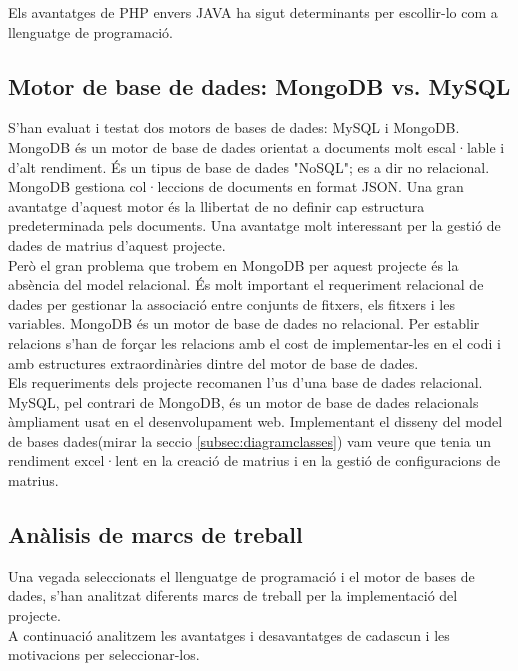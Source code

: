 Els avantatges de PHP envers JAVA ha sigut determinants per escollir-lo com a llenguatge de programació.

\subsection{Motor de base de dades: MongoDB vs. MySQL}
S'han evaluat i testat dos motors de bases de dades: MySQL i MongoDB.\\

MongoDB \'{e}s un motor de base de dades orientat a documents molt escal·lable i d'alt rendiment.\cite{mongodb} \'{E}s un tipus de base de dades "NoSQL"; es a dir no relacional.\cite{nosql} MongoDB gestiona col·leccions de documents en format JSON.\cite{apijson} Una gran avantatge d'aquest motor \'{e}s la llibertat de no definir cap estructura predeterminada pels documents. Una avantatge molt interessant per la gestió de dades de matrius d'aquest projecte.\\

Però el gran problema que trobem en MongoDB per aquest projecte \'{e}s la absència del model relacional. \'{E}s molt important el requeriment relacional de dades per gestionar la associació entre conjunts de fitxers, els fitxers i les variables. MongoDB \'{e}s un motor de base de dades no relacional. Per establir relacions s'han de forçar les relacions amb el cost de implementar-les en el codi i amb estructures extraordinàries dintre del motor de base de dades.\\

Els requeriments dels projecte recomanen l'us d'una base de dades relacional. MySQL, pel contrari de MongoDB, \'{e}s un motor de base de dades relacionals àmpliament usat en el desenvolupament web. Implementant el disseny del model de bases dades(mirar la seccio \ref{subsec:diagramclasses}) vam veure que tenia un rendiment excel·lent en la creació de matrius i en la gestió de configuracions de matrius.

\subsection{Anàlisis de marcs de treball}
Una vegada seleccionats el llenguatge de programació i el motor de bases de dades, s'han analitzat diferents marcs de treball per la implementació del projecte.\\

A continuació analitzem les avantatges i desavantatges de cadascun i les motivacions per seleccionar-los.

